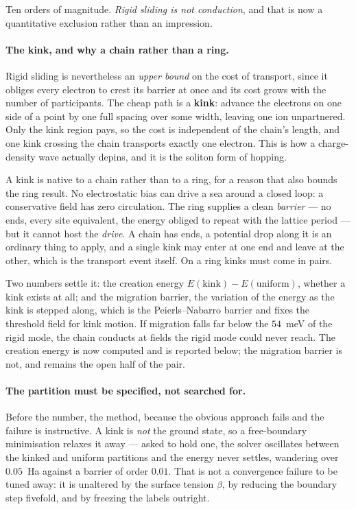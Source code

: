 \documentclass[11pt]{article}
\begin{document}
\noindent Ten orders of magnitude. \emph{Rigid sliding is not conduction}, and that is now a
quantitative exclusion rather than an impression.

\paragraph{The kink, and why a chain rather than a ring.} Rigid sliding is nevertheless an
\emph{upper bound} on the cost of transport, since it obliges every electron to crest its barrier at
once and its cost grows with the number of participants. The cheap path is a \textbf{kink}: advance
the electrons on one side of a point by one full spacing over some width, leaving one ion
unpartnered. Only the kink region pays, so the cost is independent of the chain's length, and one
kink crossing the chain transports exactly one electron. This is how a charge-density wave actually
depins, and it is the soliton form of hopping.

A kink is native to a chain rather than to a ring, for a reason that also bounds the ring result. No
electrostatic bias can drive a sea around a closed loop: a conservative field has zero circulation.
The ring supplies a clean \emph{barrier} --- no ends, every site equivalent, the energy obliged to
repeat with the lattice period --- but it cannot host the \emph{drive}. A chain has ends, a potential
drop along it is an ordinary thing to apply, and a single kink may enter at one end and leave at the
other, which is the transport event itself. On a ring kinks must come in pairs.

Two numbers settle it: the creation energy $E(\mathrm{kink})-E(\mathrm{uniform})$, whether a kink
exists at all; and the migration barrier, the variation of the energy as the kink is stepped along,
which is the Peierls--Nabarro barrier and fixes the threshold field for kink motion. If migration
falls far below the $54$~meV of the rigid mode, the chain conducts at fields the rigid mode could
never reach. The creation energy is now computed and is reported below; the migration barrier is not, and
remains the open half of the pair.

\paragraph{The partition must be specified, not searched for.} Before the number, the method,
because the obvious approach fails and the failure is instructive. A kink is \emph{not} the ground
state, so a free-boundary minimisation relaxes it away --- asked to hold one, the solver oscillates
between the kinked and uniform partitions and the energy never settles, wandering over
$0.05$~Ha against a barrier of order $0.01$. That is not a convergence failure to be tuned away:
it is unaltered by the surface tension $\beta$, by reducing the boundary step fivefold, and by
freezing the labels outright.
\end{document}
